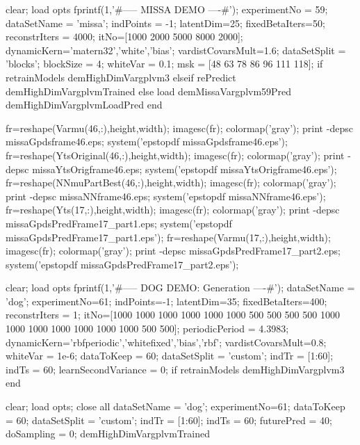 \documentclass{article} %
\newenvironment{matlab}{\comment}{\endcomment}
\begin{document}
\begin{matlab}
clear; load opts
fprintf(1,'\n\n#-----  MISSA DEMO ----#\n');
experimentNo = 59;
dataSetName = 'missa';
indPoints = -1; latentDim=25;
fixedBetaIters=50; reconstrIters = 4000;
itNo=[1000 2000 5000 8000 2000]; %
dynamicKern={'matern32','white','bias'};
vardistCovarsMult=1.6;
dataSetSplit = 'blocks';
blockSize = 4; whiteVar = 0.1;
msk = [48 63 78 86 96 111 118];
if retrainModels
    demHighDimVargplvm3
elseif rePredict
    demHighDimVargplvmTrained
else
    load demMissaVargplvm59Pred
    demHighDimVargplvmLoadPred
end

fr=reshape(Varmu(46,:),height,width); imagesc(fr); colormap('gray'); %
print -depsc missaGpdsframe46.eps; system('epstopdf missaGpdsframe46.eps');
fr=reshape(YtsOriginal(46,:),height,width); imagesc(fr); colormap('gray'); %
print -depsc missaYtsOrigframe46.eps; system('epstopdf missaYtsOrigframe46.eps');
fr=reshape(NNmuPartBest(46,:),height,width); imagesc(fr); colormap('gray'); %
print -depsc missaNNframe46.eps; system('epstopdf missaNNframe46.eps');
fr=reshape(Yts(17,:),height,width); imagesc(fr); colormap('gray'); 
print -depsc missaGpdsPredFrame17_part1.eps; system('epstopdf missaGpdsPredFrame17_part1.eps');
fr=reshape(Varmu(17,:),height,width); imagesc(fr); colormap('gray');
print -depsc missaGpdsPredFrame17_part2.eps; system('epstopdf missaGpdsPredFrame17_part2.eps');



clear; load opts
fprintf(1,'\n\n#-----  DOG DEMO: Generation ----#\n');
dataSetName = 'dog';
experimentNo=61;
indPoints=-1; latentDim=35;
fixedBetaIters=400;
reconstrIters = 1; %
itNo=[1000 1000 1000 1000 1000 1000 500 500 500 500 1000 1000 1000 1000 1000 1000 1000 500 500]; %
periodicPeriod = 4.3983; %
dynamicKern={'rbfperiodic','whitefixed','bias','rbf'};
vardistCovarsMult=0.8;
whiteVar = 1e-6;
dataToKeep = 60; dataSetSplit = 'custom';
indTr = [1:60];
indTs = 60; %
learnSecondVariance = 0;
if retrainModels
    demHighDimVargplvm3
end

clear; load opts; close all 
dataSetName = 'dog'; 
experimentNo=61; dataToKeep = 60; dataSetSplit = 'custom';
indTr = [1:60]; indTs = 60;
futurePred = 40; doSampling = 0; demHighDimVargplvmTrained


\end{matlab}
\end{document}
